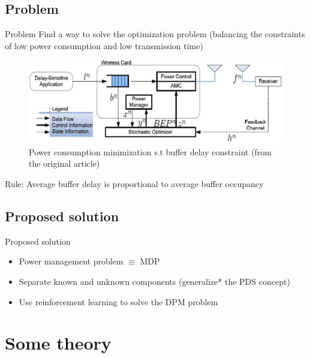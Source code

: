 \documentclass{beamer}
\begin{document}
\subsection{Problem}
\begin{frame}{Problem}
Find a way to solve the optimization problem
(balancing the constraints of low power consumption and low transmission time)
\begin{figure}
\begin{center}
\includegraphics[width=12cm]{problem_schema.jpg}
\caption{Power consumption minimization s.t buffer delay constraint (from the original article)}
\end{center}
\end{figure}
Rule: Average buffer delay is proportional to average buffer occupancy
\end{frame}

\subsection{Proposed solution}
\begin{frame}{Proposed solution}
\begin{itemize}
\item Power management problem $\equiv$ MDP
\item Separate known and unknown components (generalize* the PDS concept)
\item Use reinforcement learning to solve the DPM problem
\end{itemize}
\end{frame}

\section{Some theory}
\end{document}
